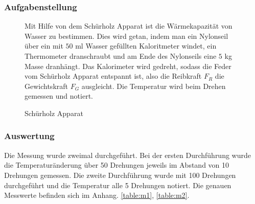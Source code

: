 \documentclass[11pt,a4paper]{article}
\begin{document}
\subsubsection{Aufgabenstellung}

\begin{figure}[h]
\begin{minipage}{.6\textwidth}
	Mit Hilfe von dem Sch\"urholz Apparat ist die W\"armekapazit\"at von Wasser zu bestimmen. Dies wird getan, indem man ein Nylonseil \"uber ein mit $50$ ml Wasser gef\"ullten Kaloritmeter windet, ein Thermometer dranschraubt und am Ende des Nylonseils eine $5$ kg Masse dranh\"angt. Das Kalorimeter wird gedreht, sodass die Feder vom Sch\"urholz Apparat entspannt ist, also die Reibkraft $F_R$ die Gewichtskraft $F_G$ ausgleicht. Die Temperatur wird beim Drehen gemessen und notiert.
\end{minipage}%
\begin{minipage}{.4\textwidth}
\centering
{}
   \renewcommand\thefigure{B1}
\caption{Schürholz Apparat}
\label{JS1}
\end{minipage}
\end{figure}

\subsubsection{Auswertung}

Die Messung wurde zweimal durchgef\"uhrt. Bei der ersten Durchf\"uhrung wurde die Temperatur\"anderung \"uber 50 Drehungen jeweils im Abstand von 10 Drehungen gemessen. Die zweite Durchf\"uhrung wurde mit 100 Drehungen durchgef\"uhrt und die Temperatur alle 5 Drehungen notiert. Die genauen Messwerte befinden sich im Anhang. \ref{table:m1}, \ref{table:m2}.
\end{document}
